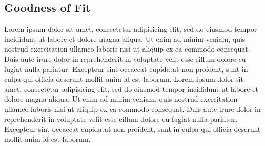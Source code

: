 
	\subsection{Goodness of Fit}
	\label{ssec:suitability}
	
		Lorem ipsum dolor sit amet, consectetur adipisicing elit, sed do eiusmod
		tempor incididunt ut labore et dolore magna aliqua. Ut enim ad minim veniam,
		quis nostrud exercitation ullamco laboris nisi ut aliquip ex ea commodo
		consequat. Duis aute irure dolor in reprehenderit in voluptate velit esse
		cillum dolore eu fugiat nulla pariatur. Excepteur sint occaecat cupidatat non
		proident, sunt in culpa qui officia deserunt mollit anim id est laborum.
		Lorem ipsum dolor sit amet, consectetur adipisicing elit, sed do eiusmod
		tempor incididunt ut labore et dolore magna aliqua. Ut enim ad minim veniam,
		quis nostrud exercitation ullamco laboris nisi ut aliquip ex ea commodo
		consequat. Duis aute irure dolor in reprehenderit in voluptate velit esse
		cillum dolore eu fugiat nulla pariatur. Excepteur sint occaecat cupidatat non
		proident, sunt in culpa qui officia deserunt mollit anim id est laborum.
	

